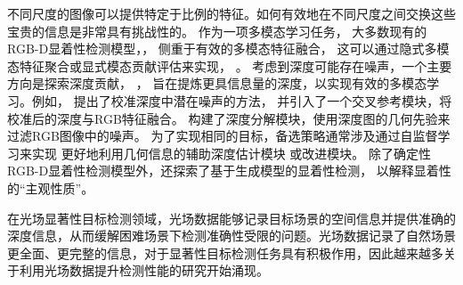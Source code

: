 不同尺度的图像可以提供特定于比例的特征。如何有效地在不同尺度之间交换这些宝贵的信息是非常具有挑战性的。
作为一项多模态学习任务，
大多数现有的RGB-D显着性检测模型\cite{peng2014rgbd}，\cite{hu2022multi}，
\cite{cheng2014depth,zhao2020single,piao2020a2dele}侧重于有效的多模态特征融合，
这可以通过隐式多模态特征聚合或显式模态贡献评估来实现\cite{zhang2021rgb}，
\cite{zhou2021specificity}。
考虑到深度可能存在噪声，一个主要方向是探索深度贡献\cite{zhang2020select}，
\cite{wang2019adaptive}，
旨在提炼更具信息量的深度，以实现有效的多模态学习。例如，
\cite{ji2021calibrated}提出了校准深度中潜在噪声的方法，
并引入了一个交叉参考模块，将校准后的深度与RGB特征融合。
\cite{sun2021deep}构建了深度分解模块，使用深度图的几何先验来过滤RGB图像中的噪声。
为了实现相同的目标，备选策略通常涉及通过自监督学习来实现
更好地利用几何信息的辅助深度估计模块\cite{zhang2021deep}
或改进模块\cite{piao2021critical}。
除了确定性RGB-D显着性检测模型外，还探索了基于生成模型的显着性检测\cite{zhang2020uc}，
以解释显着性的“主观性质”。






\label{chpt1:title:lf_methods}


在光场显著性目标检测领域，光场数据能够记录目标场景的空间信息并提供准确的深度信息，从而缓解困难场景下检测准确性受限的问题。光场数据记录了自然场景更全面、更完整的信息，对于显著性目标检测任务具有积极作用，因此越来越多关于利用光场数据提升检测性能的研究开始涌现。








